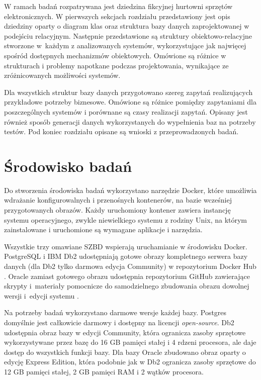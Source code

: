 \documentclass[a4paper,twoside,12pt]{book}
\begin{document}
W ramach badań rozpatrywana jest dziedzina fikcyjnej hurtowni sprzętów elektronicznych. W pierwszych sekcjach rozdziału przedstawiony jest opis dziedziny oparty o diagram klas oraz struktura bazy danych zaprojektowanej w podejściu relacyjnym. Następnie przedstawione są struktury obiektowo-relacyjne stworzone w~każdym z analizowanych systemów, wykorzystujące jak najwięcej spośród dostępnych mechanizmów obiektowych. Omówione są różnice w strukturach i problemy napotkane podczas projektowania, wynikające ze zróżnicowanych możliwości systemów.

Dla wszystkich struktur bazy danych przygotowano szereg zapytań realizujących przykładowe potrzeby biznesowe. Omówione są różnice pomiędzy zapytaniami dla poszczególnych systemów i porównane są czasy realizacji zapytań. Opisany jest również sposób generacji danych wykorzystanych do wypełnienia baz na potrzeby testów. Pod koniec rozdziału opisane są wnioski z przeprowadzonych badań. 

\section{Środowisko badań}

Do stworzenia środowiska badań wykorzystano narzędzie Docker, które umożliwia wdrażanie konfigurowalnych i przenośnych kontenerów, na bazie wcześniej przygotowanych obrazów. Każdy uruchomiony kontener zawiera instancję systemu operacyjnego, zwykle niewielkiego systemu z rodziny Unix, na którym zainstalowane i uruchomione są wymagane aplikacje i narzędzia. 

Wszystkie trzy omawiane SZBD wspierają uruchamianie w środowisku Docker. PostgreSQL i IBM Db2 udostępniają gotowe obrazy kompletnego serwera bazy danych (dla Db2 tylko darmowa edycja Community) w repozytorium Docker Hub \cite{bib:docker-db2, bib:docker-postgres}. Oracle zamiast gotowego obrazu udostępnia repozytorium GitHub zawierające skrypty i~materiały pomocnicze do samodzielnego zbudowania obrazu dowolnej wersji i~edycji systemu \cite{bib:docker-oracle}.

Na potrzeby badań wykorzystano darmowe wersje każdej bazy. Postgres domyślnie jest całkowicie darmowy i dostępny na licencji \textit{open-source}. Db2 udostępnia obraz bazy w edycji Community, która ogranicza zasoby sprzętowe wykorzystywane przez bazę do 16 GB pamięci stałej i 4 rdzeni procesora, ale daje dostęp do wszystkich funkcji bazy. Dla bazy Oracle zbudowano obraz oparty o edycję Express Edition, która podobnie jak w Db2 ogranicza zasoby sprzętowe do 12 GB pamięci stałej, 2 GB pamięci RAM i 2 wątków procesora.
\end{document}
